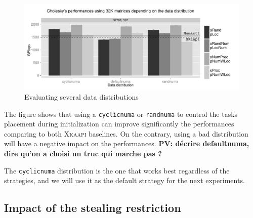 \documentclass{Styles/llncs}
\newcommand{\kaapi}{\textsc{\mbox{Xkaapi}}\xspace}
\newcommand{\PV}[1]{{\color{red}\bfseries PV: #1}}
\begin{document}
\begin{figure}[t]
  \centering
  \includegraphics[scale=0.5]{figures/graph_distrib.pdf}
\caption{Evaluating several data distributions}
\label{fig:eval-distrib}
\end{figure}

The figure shows that using a \verb/cyclicnuma/ or \verb/randnuma/ to control
the tasks placement during initialization can improve significantly the performances
comparing to both \kaapi baselines.
On the contrary, using a bad distribution will have a negative impact on the performances.
\PV{décrire defaultnuma, dire qu'on a choisi un truc qui marche pas ?}

The \verb/cyclicnuma/ distribution is the one that works best regardless of
the strategies, and we will use it as the default strategy for the next experiments.



\subsection{Impact of the stealing restriction}
\end{document}
